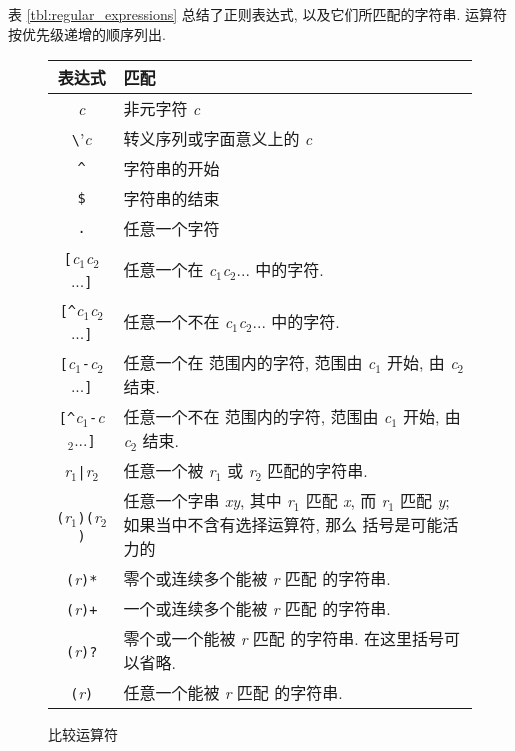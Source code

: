 表 \ref{tbl:regular_expressions} 总结了正则表达式, 以及它们所匹配的字符串.
运算符按优先级递增的顺序列出.
\begin{figure}[ht]
\caption{比较运算符}
\label{tbl:comparison_operators}
\begin{tabular}{c|l}
    \hline
    \hline
    表达式  & 匹配  \\
    \hline
    \textit{c}  & 非元字符 \textit{c}   \\
    \verb'\'\textit{c}   & 转义序列或字面意义上的 \textit{c} \\
    \verb'^'    & 字符串的开始 \\
    \verb'$'    & 字符串的结束  \\
    \verb'.'    & 任意一个字符 \\
    \verb'['\textit{c}$_1$\textit{c}$_2$...\verb']' & 任意一个在
        \textit{c}$_1$\textit{c}$_2$... 中的字符. \\
    \verb'[^'\textit{c}$_1$\textit{c}$_2$...\verb']'    & 任意一个不在
        \textit{c}$_1$\textit{c}$_2$... 中的字符. \\
    \verb'['\textit{c}$_1$\verb'-'\textit{c}$_2$...\verb']' & 任意一个在
        范围内的字符, 范围由 \textit{c}$_1$ 开始, 由 \textit{c}$_2$ 结束.
        \\
\verb'[^'\textit{c}$_1$\verb'-'\textit{c}$_2$...\verb']' & 任意一个不在
        范围内的字符, 范围由 \textit{c}$_1$ 开始,
        由 \textit{c}$_2$ 结束.  \\
    \textit{r}$_1$\verb'|'\textit{r}$_2$    & 任意一个被 \textit{r}$_1$
        或 \textit{r}$_2$ 匹配的字符串. \\
     \verb'('\textit{r}$_1$\verb')('\textit{r}$_2$\verb')'    &
         任意一个字串 \textit{xy}, 其中 \textit{r}$_1$ 匹配 \textit{x},
         而 \textit{r}$_1$ 匹配 \textit{y}; 如果当中不含有选择运算符, 那么
         括号是可能活力的 \\
     \verb'('\textit{r}\verb')*' & 零个或连续多个能被 \textit{r} 匹配
         的字符串. \\
     \verb'('\textit{r}\verb')+' & 一个或连续多个能被 \textit{r} 匹配
         的字符串. \\
     \verb'('\textit{r}\verb')?' & 零个或一个能被 \textit{r} 匹配
         的字符串. 在这里括号可以省略. \\
     \verb'('\textit{r}\verb')' & 任意一个能被 \textit{r} 匹配
         的字符串. \\
     \hline
\end{tabular}
\end{figure}


